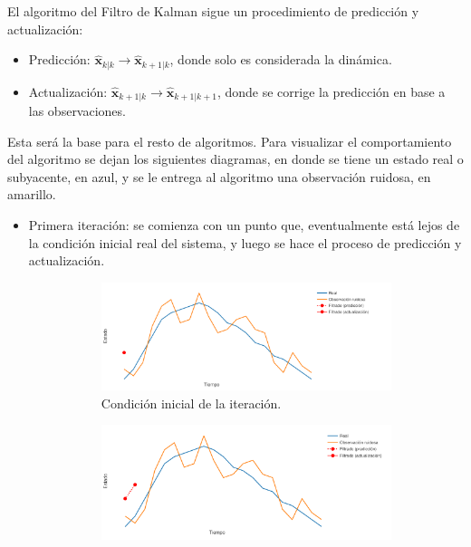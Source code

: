 El algoritmo del Filtro de Kalman sigue un procedimiento de predicción y actualización:
\begin{itemize}
    \item Predicción: $\hat{\mathbf{x}}_{k|k} \to \hat{\mathbf{x}}_{k+1|k}$, donde solo es considerada la dinámica.
    \item Actualización: $\hat{\mathbf{x}}_{k+1|k} \to \hat{\mathbf{x}}_{k+1|k+1}$, donde se corrige la predicción en base a las observaciones.
\end{itemize}
Esta será la base para el resto de algoritmos. Para visualizar el comportamiento del algoritmo se dejan los siguientes diagramas, en donde se tiene un estado real o subyacente, en azul, y se le entrega al algoritmo una observación ruidosa, en amarillo.
\begin{itemize}
    \item Primera iteración: se comienza con un punto que, eventualmente está lejos de la condición inicial real del sistema, y luego se hace el proceso de predicción y actualización.
    \begin{figure}[h!]
        \centering
        \begin{subfigure}[b]{.49\linewidth}
        \centering
            \includegraphics[width=\linewidth]{img/content/chapter2/filt0.pdf}
            \caption{Condición inicial de la iteración.}
        \end{subfigure}
        \begin{subfigure}[b]{.49\linewidth}
        \centering
            \includegraphics[width=\linewidth]{img/content/chapter2/filt1.pdf}

\end{subfigure}
\end{figure}
\end{itemize}
